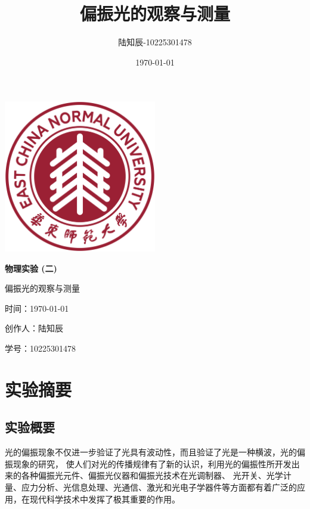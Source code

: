 \documentclass{ctexart}
\title{偏振光的观察与测量}
\author{陆知辰-10225301478}
\date{\today}
\begin{document}
\begin{titlepage}
  \centering
  \includegraphics[width=0.5\textwidth]{ecnu.png}
  
  \vspace*{\baselineskip}
  
  \Huge\textbf{物\quad 理\quad 实\quad 验 \quad (二)}
  \vspace*{0.3\baselineskip}
  
  \huge 偏振光的观察与测量
  
  \vspace*{2\baselineskip}
  
  \large 时间：\today
  
  \vspace*{\baselineskip}
  
  \large 创作人：陆知辰
  
  \vspace*{\baselineskip}
  
  \large 学号：10225301478
  
\end{titlepage}
\newpage
\tableofcontents
\newpage
\section{实验摘要}
  \subsection{实验概要}
  光的偏振现象不仅进一步验证了光具有波动性，而且验证了光是一种横波，光的偏振现象的研究，
  使人们对光的传播规律有了新的认识，利用光的偏振性所开发出来的各种偏振光元件、偏振光仪器和偏振光技术在光调制器、
  光开关、光学计量、应力分析、光信息处理、光通信、激光和光电子学器件等方面都有着广泛的应用，在现代科学技术中发挥了极其重要的作用。
\end{document}
